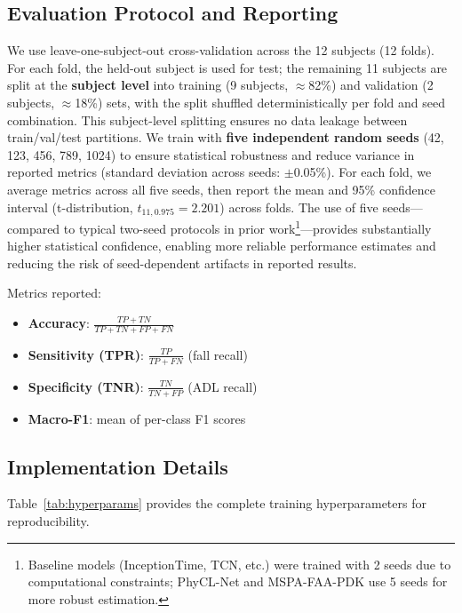 \documentclass{article}
\begin{document}
\subsection{Evaluation Protocol and Reporting}

We use leave-one-subject-out cross-validation across the 12 subjects (12 folds). For each fold, the held-out subject is used for test; the remaining 11 subjects are split at the \textbf{subject level} into training (9 subjects, $\approx$82\%) and validation (2 subjects, $\approx$18\%) sets, with the split shuffled deterministically per fold and seed combination. This subject-level splitting ensures no data leakage between train/val/test partitions. We train with \textbf{five independent random seeds} (42, 123, 456, 789, 1024) to ensure statistical robustness and reduce variance in reported metrics (standard deviation across seeds: $\pm$0.05\%). For each fold, we average metrics across all five seeds, then report the mean and 95\% confidence interval (t-distribution, $t_{11, 0.975} = 2.201$) across folds. The use of five seeds---compared to typical two-seed protocols in prior work\footnote{Baseline models (InceptionTime, TCN, etc.) were trained with 2 seeds due to computational constraints; PhyCL-Net and MSPA-FAA-PDK use 5 seeds for more robust estimation.}---provides substantially higher statistical confidence, enabling more reliable performance estimates and reducing the risk of seed-dependent artifacts in reported results.

Metrics reported:
\begin{itemize}
    \item \textbf{Accuracy}: $\frac{TP+TN}{TP+TN+FP+FN}$
    \item \textbf{Sensitivity (TPR)}: $\frac{TP}{TP+FN}$ (fall recall)
    \item \textbf{Specificity (TNR)}: $\frac{TN}{TN+FP}$ (ADL recall)
    \item \textbf{Macro-F1}: mean of per-class F1 scores
\end{itemize}

\subsection{Implementation Details}

Table~\ref{tab:hyperparams} provides the complete training hyperparameters for reproducibility.
\end{document}
